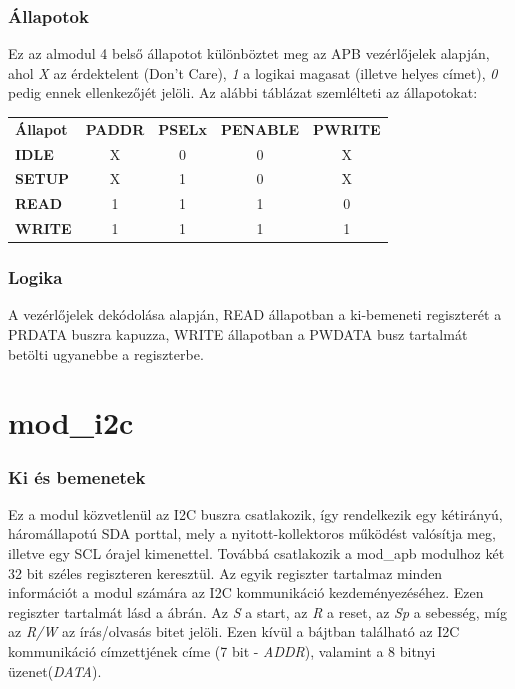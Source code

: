\subsubsection{Állapotok}
    Ez az almodul 4 belső állapotot különböztet meg az APB vezérlőjelek alapján, ahol \emph{X} az érdektelent (Don't Care), \emph{1}  a logikai magasat (illetve helyes címet), \emph{0}  pedig ennek ellenkezőjét jelöli. Az alábbi táblázat szemlélteti az állapotokat:\\[2ex]

    \begin{tabular}{l|c|c|c|c}
        \textbf{Állapot}& \textbf{PADDR} & \textbf{PSELx} & \textbf{PENABLE}   & \textbf{PWRITE}    \\
        \textbf{IDLE}   &   X            & 0              & 0                  & X                  \\
        \textbf{SETUP}  &   X            & 1              & 0                  & X                  \\
        \textbf{READ}   &   1            & 1              & 1                  & 0                  \\
        \textbf{WRITE}  &   1            & 1              & 1                  & 1
    \end{tabular}

\subsubsection{Logika}
    A vezérlőjelek dekódolása alapján, READ állapotban a ki-bemeneti regiszterét a PRDATA buszra kapuzza, WRITE állapotban a PWDATA busz tartalmát betölti ugyanebbe a regiszterbe.


\section{mod\_i2c}
\subsubsection{Ki és bemenetek}
    Ez a modul közvetlenül az I2C buszra csatlakozik, így rendelkezik egy kétirányú, háromállapotú SDA porttal, mely a nyitott-kollektoros működést valósítja meg, illetve egy SCL órajel kimenettel. Továbbá csatlakozik a mod\_apb modulhoz két 32 bit széles regiszteren keresztül. Az egyik regiszter tartalmaz minden információt a modul számára az I2C kommunikáció kezdeményezéséhez. Ezen regiszter tartalmát lásd a  ábrán. Az \textit{S} a start, az \textit{R} a reset, az \textit{Sp} a sebesség, míg az \textit{R/W} az írás/olvasás bitet jelöli. Ezen kívül a bájtban található az I2C kommunikáció címzettjének címe (7 bit - \textit{ADDR}), valamint a 8 bitnyi üzenet(\textit{DATA}).
    
